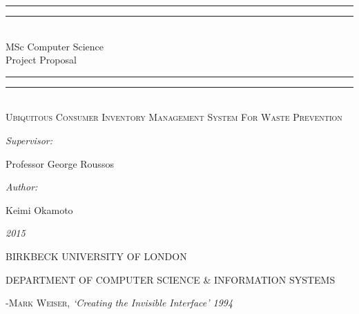 \documentclass[a4paper, 11pt]{article}
\newlength{\drop}
\begin{document}
  \begin{titlepage}
	\thispagestyle{empty}
    \textheight
    \centering
    \vspace*{\baselineskip}
    \rule{\textwidth}{1.6pt}\vspace*{-\baselineskip}\vspace*{2pt}
    \rule{\textwidth}{0.4pt}\\[\baselineskip]
    {\Large{MSc Computer Science\\[0.3\baselineskip] }} 	
    {\huge{Project Proposal\\[0.3\baselineskip] }}
	
    \rule{\textwidth}{0.4pt}\vspace*{-\baselineskip}\vspace{3.2pt}
    \rule{\textwidth}{1.6pt}
    \\[\baselineskip]
    \scshape
    {\Large Ubiquitous Consumer Inventory Management System For Waste Prevention\\}
    \vspace*{2\baselineskip}
    {\normalsize\emph{Supervisor: }{\large Professor George Roussos\par}}
    {\normalsize\emph{Author: }{\large Keimi Okamoto\par}}
    
    {\itshape 2015}
    \vfill
    {\large BIRKBECK UNIVERSITY OF LONDON\par}
{\footnotesize DEPARTMENT OF COMPUTER SCIENCE \& INFORMATION SYSTEMS}\par
  \end{titlepage}
  

\tableofcontents
\clearpage

\epigraph{}
{\textsc{-Mark Weiser,}\textit{ `Creating the Invisible Interface' 1994}}
\end{document}
